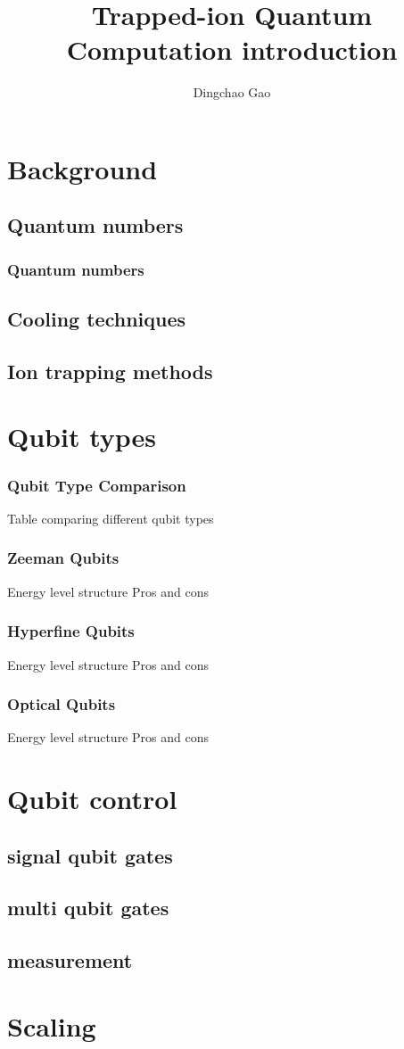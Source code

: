 \documentclass[18 pt]{beamer}
\title{Trapped-ion Quantum Computation introduction}
\author[Gcc]{Dingchao Gao}
\institute[ISCAS]{Institute of Software Chinese Academy of Sciences}
\begin{document}
\begin{frame}[plain]
  \titlepage
\end{frame}
\section{Background}
\subsection{Quantum numbers}
\begin{frame}
  \frametitle{Quantum numbers}
\end{frame}
\subsection{Cooling techniques}
\subsection{Ion trapping methods}

\section{Qubit types}
\begin{frame}{}
  \frametitle{Qubit Type Comparison}
  Table comparing different qubit types 
\end{frame}
\begin{frame}{}
  \frametitle{Zeeman Qubits}
  Energy level structure
  Pros and cons \end{frame}
  \begin{frame}{}
  \frametitle{Hyperfine Qubits}
  Energy level structure
  Pros and cons
\end{frame}
\begin{frame}{}
  \frametitle{Optical Qubits}
  Energy level structure
  Pros and cons
\end{frame}
\section{Qubit control}
\subsection{signal qubit gates}
\subsection{multi qubit gates}
\subsection{measurement}
\section{Scaling}
\end{document}
